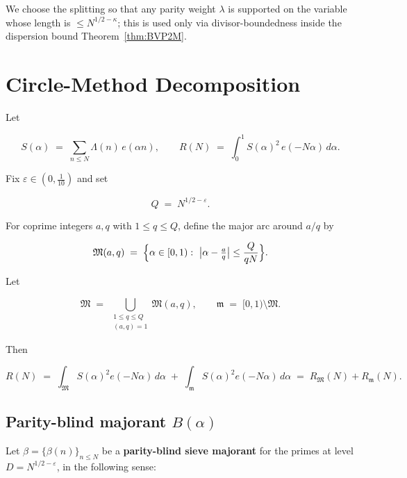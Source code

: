 \documentclass[11pt]{article}
\theoremstyle{definition}
\theoremstyle{remark}
\numberwithin{equation}{part}
\begin{document}
We choose the splitting so that any parity weight $\lambda$ is supported on the variable whose length is $\le N^{1/2-\kappa}$; this is used only via divisor-boundedness inside the dispersion bound Theorem~\ref{thm:BVP2M}.



\section{Circle-Method Decomposition}

Let

$$
	S(\alpha)\;=\;\sum_{n\le N}\Lambda(n)\,e(\alpha n),\qquad
	R(N)\;=\;\int_{0}^{1} S(\alpha)^2\,e(-N\alpha)\,d\alpha .
$$

Fix $\varepsilon\in (0,\tfrac1{10})$ and set

$$
	Q \;=\; N^{1/2-\varepsilon}.
$$

For coprime integers $a,q$ with $1\le q\le Q$, define the major arc around $a/q$ by

$$
	\mathfrak M(a,q)\;=\;\Bigl\{\alpha\in[0,1):\ \bigl|\alpha-\tfrac{a}{q}\bigr|
	\le \frac{Q}{qN}\Bigr\}.
$$

Let

$$
	\mathfrak M\;=\;\bigcup_{\substack{1\le q\le Q\\ (a,q)=1}}\mathfrak M(a,q),
	\qquad
	\mathfrak m\;=\;[0,1)\setminus\mathfrak M .
$$

Then

$$
	R(N)\;=\;\int_{\mathfrak M} S(\alpha)^2 e(-N\alpha)\,d\alpha\;+\;
	\int_{\mathfrak m} S(\alpha)^2 e(-N\alpha)\,d\alpha
	\;=\;R_{\mathfrak M}(N)+R_{\mathfrak m}(N).
$$


\subsection*{Parity-blind majorant \texorpdfstring{$B(\alpha)$}{B\textalpha}}

Let $\beta=\{\beta(n)\}_{n\le N}$ be a \textbf{parity-blind sieve majorant} for the primes at level $D=N^{1/2-\varepsilon}$, in the following sense:
\end{document}
